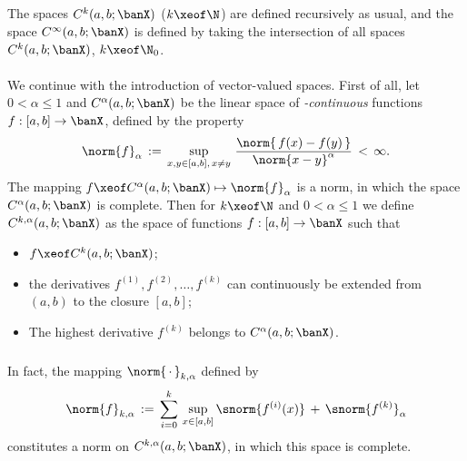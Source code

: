 \documentclass[11pt,twoside]{article}
\begin{document}
\subparagraph{} %
The spaces $C^k(a,b;\banX)$ ($k \xeof \N$) are defined recursively as usual,
and the space $C^{\infty}(a,b;\banX)$ is defined
by taking the intersection of all spaces $C^k(a,b;\banX)$,
$k \xeof \N_0$.

\paragraph{} %
We continue with the introduction of vector-valued {\HOELDER} spaces.
First of all,
let $0 < \alpha \leq 1$ and $C^{\alpha}(a,b;\banX)$ be the linear space of
\textit{{\HOELDER}-continuous} functions $f:[a,b] \to \banX$,
defined by the property
\begin{equation}\label{II_HOELDER_NORM_2}
\norm{f} _{\alpha} \, := \,
\sup_{x,y \in [a,b], \, x \neq y} \,
\frac{\norm{\, f(x) - f(y) \,} }
     {\norm{x-y} ^{\alpha}}
\, < \, \infty.
\end{equation}
The mapping $f \xeof C^{\alpha}(a,b;\banX) \mapsto \norm{f}_{\alpha}$ is a norm,
in which the space $C^{\alpha}(a,b;\banX)$ is complete.
Then for $k \xeof \N$ and $0 < \alpha \leq 1$ we define
$C^{k,\alpha}(a,b;\banX)$ as the space of functions $f:[a,b] \to \banX$
such that

\begin{itemize}[leftmargin=15pt]
\item[(a)]
$f \xeof C^k(a,b;\banX)$;

\item[(b)]
the derivatives
$f^{(1)},f^{(2)},\ldots,f^{(k)}$
can continuously be extended from $(a,b)$ to the closure $[a,b]$;

\item[(c)]
The highest derivative $f^{(k)}$ belongs to $C^{\alpha}(a,b;\banX)$.
\end{itemize}

\subparagraph{}
In fact, the mapping $\norm{\,\cdot\,}_{k,\alpha}$ defined by
\[
\norm{f}_{k,\alpha} \, := \,
\sum_{i=0}^k \, \sup_{x \in [a,b]} \snorm{f^{(i)}(x)} \, + \,
\snorm{f^{(k)}}_{\alpha}
\]
constitutes a norm on $C^{k,\alpha}(a,b;\banX)$,
in which this space is complete.
\end{document}
